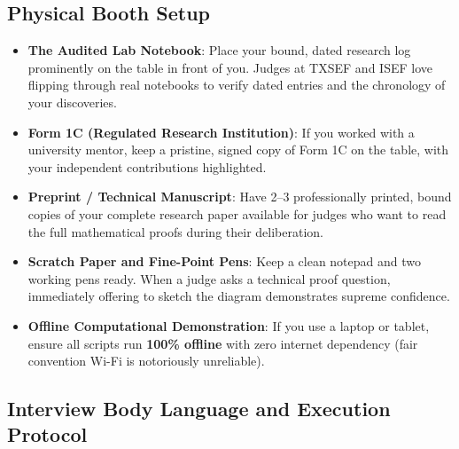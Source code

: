 \documentclass[11pt,letterpaper]{article}
\begin{document}
\subsection{Physical Booth Setup}

\begin{itemize}[leftmargin=*]
    \item \textbf{The Audited Lab Notebook}: Place your bound, dated research log prominently on the table in front of you. Judges at TXSEF and ISEF love flipping through real notebooks to verify dated entries and the chronology of your discoveries.
    \item \textbf{Form 1C (Regulated Research Institution)}: If you worked with a university mentor, keep a pristine, signed copy of Form 1C on the table, with your independent contributions highlighted.
    \item \textbf{Preprint / Technical Manuscript}: Have 2--3 professionally printed, bound copies of your complete research paper available for judges who want to read the full mathematical proofs during their deliberation.
    \item \textbf{Scratch Paper and Fine-Point Pens}: Keep a clean notepad and two working pens ready. When a judge asks a technical proof question, immediately offering to sketch the diagram demonstrates supreme confidence.
    \item \textbf{Offline Computational Demonstration}: If you use a laptop or tablet, ensure all scripts run \textbf{100\% offline} with zero internet dependency (fair convention Wi-Fi is notoriously unreliable).
\end{itemize}

\subsection{Interview Body Language and Execution Protocol}
\end{document}
